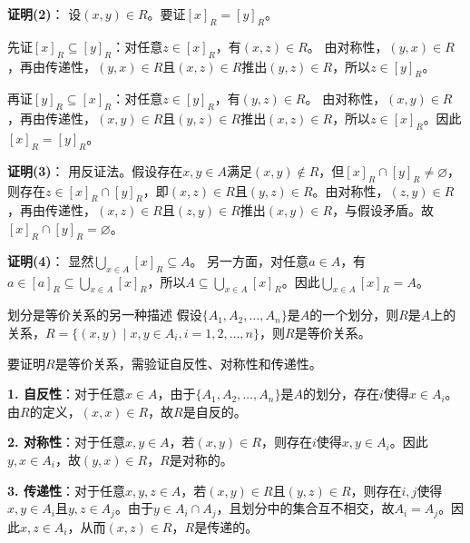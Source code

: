 \documentclass[lang=cn,11pt]{elegantbook}
\begin{document}
\textbf{证明(2)}：
设$(x,y) \in R$。要证$[x]_R = [y]_R$。

先证$[x]_R \subseteq [y]_R$：对任意$z \in [x]_R$，有$(x,z) \in R$。
由对称性，$(y,x) \in R$，再由传递性，$(y,x) \in R$且$(x,z) \in R$推出$(y,z) \in R$，所以$z \in [y]_R$。

再证$[y]_R \subseteq [x]_R$：对任意$z \in [y]_R$，有$(y,z) \in R$。
由对称性，$(x,y) \in R$，再由传递性，$(x,y) \in R$且$(y,z) \in R$推出$(x,z) \in R$，所以$z \in [x]_R$。因此$[x]_R = [y]_R$。

\textbf{证明(3)}：
用反证法。假设存在$x,y \in A$满足$(x,y) \notin R$，但$[x]_R \cap [y]_R \neq \varnothing$，
则存在$z \in [x]_R \cap [y]_R$，即$(x,z) \in R$且$(y,z) \in R$。由对称性，$(z,y) \in R$，再由传递性，$(x,z) \in R$且$(z,y) \in R$推出$(x,y) \in R$，与假设矛盾。故$[x]_R \cap [y]_R = \varnothing$。

\textbf{证明(4)}：
显然$\bigcup_{x\in A} [x]_R \subseteq A$。
另一方面，对任意$a \in A$，有$a \in [a]_R \subseteq \bigcup_{x\in A} [x]_R$，所以$A \subseteq \bigcup_{x\in A} [x]_R$。因此$\bigcup_{x\in A} [x]_R = A$。
\begin{theorem}{划分是等价关系的另一种描述}
    假设$\{A_1, A_2, \ldots, A_n\}$是$A$的一个划分，则$R$是$A$上的关系，$R=\{(x,y) \mid x,y\in A_i,i=1,2,\ldots,n\}$，则$R$是等价关系。
\end{theorem}
要证明$R$是等价关系，需验证自反性、对称性和传递性。

\textbf{1. 自反性}：对于任意$x \in A$，由于$\{A_1, A_2, \ldots, A_n\}$是$A$的划分，存在$i$使得$x \in A_i$。由$R$的定义，$(x, x) \in R$，故$R$是自反的。

\textbf{2. 对称性}：对于任意$x, y \in A$，若$(x, y) \in R$，则存在$i$使得$x, y \in A_i$。因此$y, x \in A_i$，故$(y, x) \in R$，$R$是对称的。

\textbf{3. 传递性}：对于任意$x, y, z \in A$，若$(x, y) \in R$且$(y, z) \in R$，则存在$i, j$使得$x, y \in A_i$且$y, z \in A_j$。由于$y \in A_i \cap A_j$，且划分中的集合互不相交，故$A_i = A_j$。因此$x, z \in A_i$，从而$(x, z) \in R$，$R$是传递的。
\end{document}
